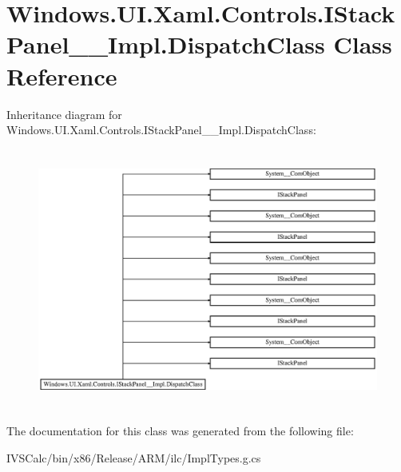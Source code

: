 \hypertarget{class_windows_1_1_u_i_1_1_xaml_1_1_controls_1_1_i_stack_panel_____impl_1_1_dispatch_class}{}\section{Windows.\+U\+I.\+Xaml.\+Controls.\+I\+Stack\+Panel\+\_\+\+\_\+\+Impl.\+Dispatch\+Class Class Reference}
\label{class_windows_1_1_u_i_1_1_xaml_1_1_controls_1_1_i_stack_panel_____impl_1_1_dispatch_class}
Inheritance diagram for Windows.\+U\+I.\+Xaml.\+Controls.\+I\+Stack\+Panel\+\_\+\+\_\+\+Impl.\+Dispatch\+Class\+:\begin{figure}[H]
\begin{center}
\leavevmode
\includegraphics[height=8.603352cm]{class_windows_1_1_u_i_1_1_xaml_1_1_controls_1_1_i_stack_panel_____impl_1_1_dispatch_class}
\end{center}
\end{figure}


The documentation for this class was generated from the following file\+:\begin{DoxyCompactItemize}
\item 
I\+V\+S\+Calc/bin/x86/\+Release/\+A\+R\+M/ilc/Impl\+Types.\+g.\+cs\end{DoxyCompactItemize}
